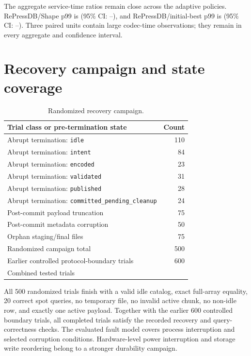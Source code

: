 \documentclass[preprint,12pt,authoryear]{elsarticle}
\begin{document}
The aggregate service-time ratios remain close across the adaptive policies. RePressDB/Shape p99 is \EndToEndRepressShapePnnRatio{} (95\% CI: \EndToEndRepressShapePnnLow--\EndToEndRepressShapePnnHigh), and RePressDB/initial-best p99 is \EndToEndRepressInitialPnnRatio{} (95\% CI: \EndToEndRepressInitialPnnLow--\EndToEndRepressInitialPnnHigh). Three paired units contain large codec-time observations; they remain in every aggregate and confidence interval.

\section{Recovery campaign and state coverage}

\begin{table}[H]
\centering
\caption{Randomized recovery campaign.}
\begin{tabular}{@{}lr@{}}
\toprule
Trial class or pre-termination state & Count \\
\midrule
Abrupt termination: \texttt{idle} & 110 \\
Abrupt termination: \texttt{intent} & 84 \\
Abrupt termination: \texttt{encoded} & 23 \\
Abrupt termination: \texttt{validated} & 31 \\
Abrupt termination: \texttt{published} & 28 \\
Abrupt termination: \texttt{committed\_pending\_cleanup} & 24 \\
Post-commit payload truncation & 75 \\
Post-commit metadata corruption & 50 \\
Orphan staging/final files & 75 \\
\midrule
Randomized campaign total & 500 \\
Earlier controlled protocol-boundary trials & 600 \\
Combined tested trials & \CombinedRecoveryTrials{} \\
\bottomrule
\end{tabular}
\end{table}

All 500 randomized trials finish with a valid idle catalog, exact full-array equality, 20 correct spot queries, no temporary file, no invalid active chunk, no non-idle row, and exactly one active payload. Together with the earlier 600 controlled boundary trials, all \CombinedRecoveryTrials{} completed trials satisfy the recorded recovery and query-correctness checks. The evaluated fault model covers process interruption and selected corruption conditions. Hardware-level power interruption and storage write reordering belong to a stronger durability campaign.
\end{document}
